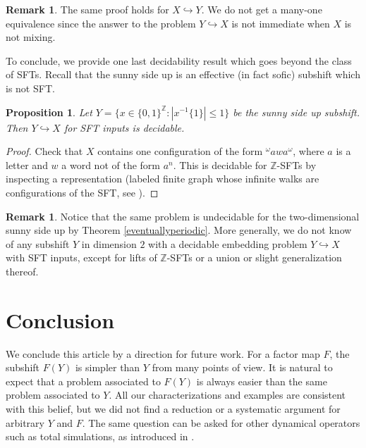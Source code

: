 \documentclass[a4paper]{article}
\newcommand{\Z}{\mathbb{Z}}
\newtheorem{proposition}[theorem]{Proposition}
\theoremstyle{definition}
\newtheorem{remark}[theorem]{Remark}
\begin{document}
\begin{remark}
    The same proof holds for $X \hookrightarrow Y$. We do not get a many-one equivalence since the answer to the problem $Y \hookrightarrow X$ is not immediate when $X$ is not mixing.
\end{remark}

To conclude, we provide one last decidability result which goes beyond the class of SFTs. Recall that the sunny side up is an effective (in fact sofic) subshift which is not SFT.
\begin{proposition}
    Let $Y = \{x\in \{0,1\}^{\mathbb{Z}} : |x^{-1}\{1\}|\leq 1\}$ be the sunny side up subshift.
    Then $Y \hookrightarrow X$ for SFT inputs is decidable.
\end{proposition}
\begin{proof}
    Check that $X$ contains one configuration of the form ${}^{\omega}awa^{\omega}$, where $a$ is a letter and $w$ a word not of the form $a^n$. This is decidable for $\Z$-SFTs by inspecting a representation (labeled finite graph whose infinite walks are configurations of the SFT, see \cite[\S 2.3]{lind_introduction_1995}). 
\end{proof}

\begin{remark}
Notice that the same problem is undecidable for the two-dimensional sunny side up by Theorem \ref{eventuallyperiodic}. More generally, we do not know of any subshift $Y$ in dimension $2$ with a decidable embedding problem $Y\hookrightarrow X$ with SFT inputs, except for lifts of $\mathbb{Z}$-SFTs or a union or slight generalization thereof.
\end{remark}

\section{Conclusion}

We conclude this article by a direction for future work. For a factor map $F$, the subshift $F(Y)$ is simpler than $Y$ from many points of view. It is natural to expect that a problem associated to $F(Y)$ is always easier than the same problem associated to $Y$. All our characterizations and examples are consistent with this belief, but we did not find a reduction or a systematic argument for arbitrary $Y$ and $F$. The same question can be asked for other dynamical operators such as total simulations, as introduced in \cite{lafitte_computability_2008}.




\end{document}
